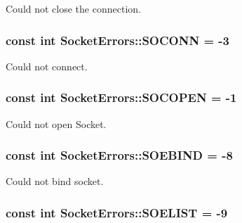 \-Could not close the connection. 

\hypertarget{class_socket_errors_a28dc96b2bf49ce93cadd9e050bf2a40e}{
\subsubsection[{\-S\-O\-C\-O\-N\-N}]{\setlength{\rightskip}{0pt plus 5cm}const int {\bf \-Socket\-Errors\-::\-S\-O\-C\-O\-N\-N} = -\/3}}
\label{class_socket_errors_a28dc96b2bf49ce93cadd9e050bf2a40e}


\-Could not connect. 

\hypertarget{class_socket_errors_a66d33f33f1a5dd255a188ee31d3474da}{
\subsubsection[{\-S\-O\-C\-O\-P\-E\-N}]{\setlength{\rightskip}{0pt plus 5cm}const int {\bf \-Socket\-Errors\-::\-S\-O\-C\-O\-P\-E\-N} = -\/1}}
\label{class_socket_errors_a66d33f33f1a5dd255a188ee31d3474da}


\-Could not open \-Socket. 

\hypertarget{class_socket_errors_a225189d5d61f1182aa597be3f5832a12}{
\subsubsection[{\-S\-O\-E\-B\-I\-N\-D}]{\setlength{\rightskip}{0pt plus 5cm}const int {\bf \-Socket\-Errors\-::\-S\-O\-E\-B\-I\-N\-D} = -\/8}}
\label{class_socket_errors_a225189d5d61f1182aa597be3f5832a12}


\-Could not bind socket. 

\hypertarget{class_socket_errors_a9c55f054128988926f1518d4eb00cf06}{
\subsubsection[{\-S\-O\-E\-L\-I\-S\-T}]{\setlength{\rightskip}{0pt plus 5cm}const int {\bf \-Socket\-Errors\-::\-S\-O\-E\-L\-I\-S\-T} = -\/9}}
\label{class_socket_errors_a9c55f054128988926f1518d4eb00cf06}


